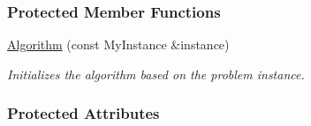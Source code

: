 \subsubsection*{Protected Member Functions}
\begin{DoxyCompactItemize}
\item 
\hyperlink{structAlgorithm_a1c8daf99326761343b631fe1b1cbac7c}{Algorithm} (const My\+Instance \&instance)
\begin{DoxyCompactList}\small\item\em Initializes the algorithm based on the problem instance. \end{DoxyCompactList}\end{DoxyCompactItemize}
\subsubsection*{Protected Attributes}
